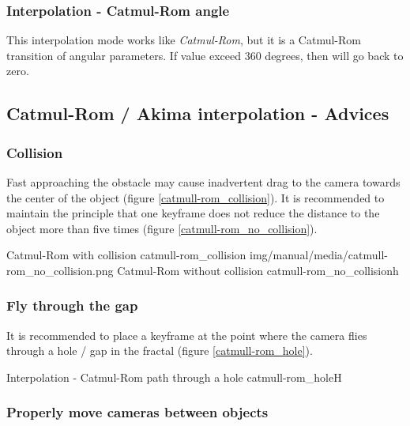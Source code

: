 \subsubsection{Interpolation - Catmul-Rom
	angle}\label{interpolation-catmul-rom-angle}

This interpolation mode works like \emph{Catmul-Rom}, but it is a Catmul-Rom transition of angular
parameters. If value exceed 360 degrees, then will go back to zero.

\subsection{Catmul-Rom / Akima interpolation -
	Advices}\label{catmul-rom-akima-interpolation}

\subsubsection{Collision}\label{collision}

Fast approaching the obstacle may cause inadvertent drag to the camera towards
the center of the object (figure \ref{catmull-rom_collision}). It is recommended to maintain the principle that one
keyframe does not reduce the distance to the object more than five times (figure \ref{catmull-rom_no_collision}).

{Catmul-Rom with collision}
{catmull-rom_collision}
{img/manual/media/catmull-rom_no_collision.png}
{Catmul-Rom without collision}
{catmull-rom_no_collision}{h}

\subsubsection{Fly through the gap}\label{fly-through-the-gap}

It is recommended to place a keyframe at the point where the camera flies
through a hole / gap in the fractal (figure \ref{catmull-rom_hole}).

{Interpolation - Catmul-Rom path through a hole}
{catmull-rom_hole}{H}

\subsubsection{Properly move cameras between
	objects}\label{proper-conduct-cameras-between-objects}

